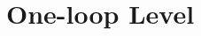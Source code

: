 \documentclass[aspectratio=169,usenames,dvipsnames]{beamer}
\begin{document}
\section{\bf One-loop Level}
\end{document}
